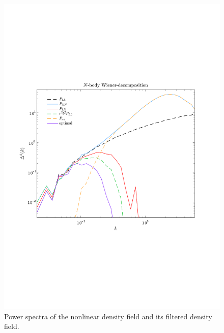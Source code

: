 \documentclass[aps,prd,twocolumn,superscriptaddress,amsfont,amssymb,amsmath,nofootinbib,showpacs,balancelastpage]{revtex4-1}
\begin{document}
\begin{figure}[t] \centering
  \includegraphics[width=1.0\linewidth]{fig3.pdf}
  \caption{Power spectra of the nonlinear density field and its
  filtered density field.}
  \label{fig.3}
\end{figure}
\end{document}
